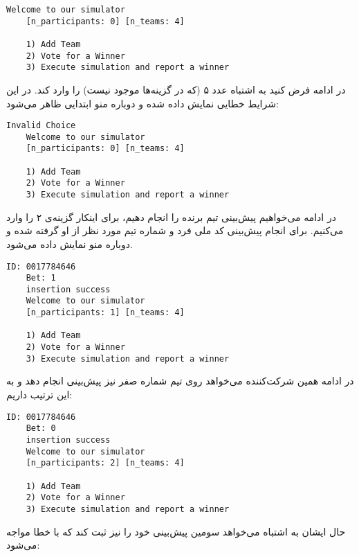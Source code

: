 \documentclass[../main.tex]{subfiles}
\begin{document}
\begin{latin}
\begin{lstlisting}[]
    Welcome to our simulator
    [n_participants: 0] [n_teams: 4]

    1) Add Team
    2) Vote for a Winner
    3) Execute simulation and report a winner
\end{lstlisting}
\end{latin}

در ادامه فرض کنید به اشتباه عدد ۵ (که در گزینه‌ها موجود نیست) را وارد کند.
در این شرایط خطایی نمایش داده شده و دوباره منو ابتدایی ظاهر می‌شود:

\begin{latin}
\begin{lstlisting}[]
    Invalid Choice
    Welcome to our simulator
    [n_participants: 0] [n_teams: 4]

    1) Add Team
    2) Vote for a Winner
    3) Execute simulation and report a winner
\end{lstlisting}
\end{latin}

در ادامه می‌خواهیم پیش‌بینی تیم برنده را انجام دهیم، برای اینکار گزینه‌ی ۲ را وارد می‌کنیم.
برای انجام پیش‌بینی کد ملی فرد و شماره تیم مورد نظر از او گرفته شده و دوباره منو نمایش داده می‌شود.

\begin{latin}
\begin{lstlisting}[]
    ID: 0017784646
    Bet: 1
    insertion success
    Welcome to our simulator
    [n_participants: 1] [n_teams: 4]

    1) Add Team
    2) Vote for a Winner
    3) Execute simulation and report a winner
\end{lstlisting}
\end{latin}

در ادامه همین شرکت‌کننده می‌خواهد روی تیم شماره صفر نیز پیش‌بینی انجام دهد و به این ترتیب داریم:

\begin{latin}
\begin{lstlisting}[]
    ID: 0017784646
    Bet: 0
    insertion success
    Welcome to our simulator
    [n_participants: 2] [n_teams: 4]

    1) Add Team
    2) Vote for a Winner
    3) Execute simulation and report a winner
\end{lstlisting}
\end{latin}

حال ایشان به اشتباه می‌خواهد سومین پیش‌بینی خود را نیز ثبت کند که با خطا مواجه می‌شود:
\end{document}
